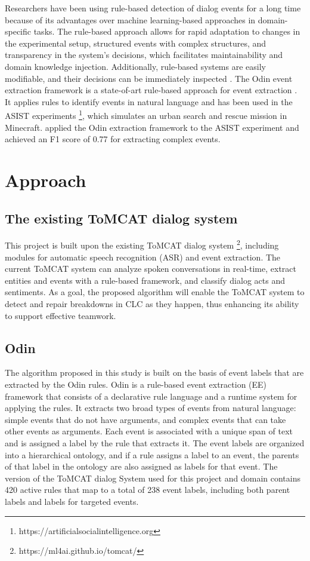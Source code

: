 \documentclass[11pt]{article}
\begin{document}
Researchers have been using rule-based detection of dialog events for a long time because of its advantages over machine learning-based approaches in domain-specific tasks. The rule-based approach allows for rapid adaptation to changes in the experimental setup, structured events with complex structures, and transparency in the system's decisions, which facilitates maintainability and domain knowledge injection. Additionally, rule-based systems are easily modifiable, and their decisions can be immediately inspected \citep{nitschke2022rule}. The Odin event extraction framework is a state-of-art rule-based approach for  event extraction \citep{valenzuela-escarcega-etal-2016-odins}. It applies rules to identify events in natural language and has been used in the ASIST experiments \footnote{https://artificialsocialintelligence.org}, which simulates an urban search and rescue mission in Minecraft. \citet{nitschke2022rule} applied the Odin extraction framework to the ASIST experiment and achieved an F1 score of 0.77 for extracting complex events.

\section{Approach}
\subsection{The existing ToMCAT dialog system}
This project is built upon the existing ToMCAT dialog system \footnote{https://ml4ai.github.io/tomcat/}, including modules for automatic speech recognition (ASR) and event extraction. The current ToMCAT system can analyze spoken conversations in real-time, extract entities and events with a rule-based framework, and classify dialog acts and sentiments. As a goal, the proposed algorithm will enable the ToMCAT system to detect and repair breakdowns in CLC as they happen, thus enhancing its ability to support effective teamwork. 
\subsection{Odin}
The algorithm proposed in this study is built on the basis of event labels that are extracted by the Odin rules. Odin is a rule-based event extraction (EE) framework that consists of a declarative rule language and a runtime system for applying the rules. It extracts two broad types of events from natural language: simple events that do not have arguments, and complex events that can take other events as arguments. Each event is associated with a unique span of text and is assigned a label by the rule that extracts it. The event labels are organized into a hierarchical ontology, and if a rule assigns a label to an event, the parents of that label in the ontology are also assigned as labels for that event. The version of the ToMCAT dialog System used for this project and domain contains 420 active rules that map to a total of 238 event labels, including both parent labels and labels for targeted events. 
\end{document}
